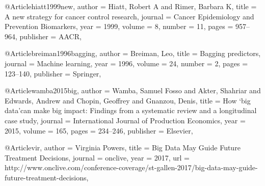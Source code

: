 \documentclass[sigconf]{acmart}
\begin{document}
@Article{hiatt1999new,
  author    = {Hiatt, Robert A and Rimer, Barbara K},
  title     = {A new strategy for cancer control research},
  journal   = {Cancer Epidemiology and Prevention Biomarkers},
  year      = {1999},
  volume    = {8},
  number    = {11},
  pages     = {957--964},
  publisher = {AACR},
}

@Article{breiman1996bagging,
  author    = {Breiman, Leo},
  title     = {Bagging predictors},
  journal   = {Machine learning},
  year      = {1996},
  volume    = {24},
  number    = {2},
  pages     = {123--140},
  publisher = {Springer},
}

@Article{wamba2015big,
  author    = {Wamba, Samuel Fosso and Akter, Shahriar and Edwards, Andrew and Chopin, Geoffrey and Gnanzou, Denis},
  title     = {How ‘big data’can make big impact: Findings from a systematic review and a longitudinal case study},
  journal   = {International Journal of Production Economics},
  year      = {2015},
  volume    = {165},
  pages     = {234--246},
  publisher = {Elsevier},
}

@Article{vir,
  author  = {Virginia Powers},
  title   = {Big Data May Guide Future Treatment Decisions},
  journal = {onclive},
  year    = {2017},
  url     = {http://www.onclive.com/conference-coverage/st-gallen-2017/big-data-may-guide-future-treatment-decisions},
}

\end{document}
